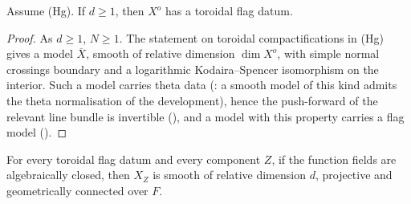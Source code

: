 \begin{proposition}\label{pf:lift2:torflag}
Assume \textup{(Hg)}. If $d\ge1$, then $X^o$ has a toroidal flag datum.
\end{proposition}

\begin{proof}
As $d\ge1$, $N\ge1$. The statement on toroidal compactifications in \textup{(Hg)} gives a model $\overline X$, smooth of
relative dimension $\dim X^o$, with simple normal crossings boundary and a logarithmic Kodaira--Spencer isomorphism on
the interior. Such a model carries theta data (: a smooth model of
this kind admits the theta normalisation of the development), hence the push-forward of the relevant line bundle is
invertible (), and a model with this property carries a
flag model ().
\end{proof}

\begin{proposition}\label{pf:lift2:flagvar}
For every toroidal flag datum and every component $Z$, if the function fields are algebraically closed, then $X_Z$ is
smooth of relative dimension $d$, projective and geometrically connected over $F$.
\end{proposition}


